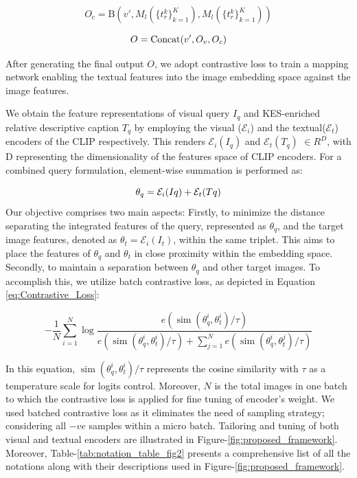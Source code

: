 \documentclass[10pt,lineno]{wlpeerj}
\begin{document}
\begin{equation}
    O_c = \text{B}(v', M_l(\{t_r^k\}_{k=1}^K), M_l(\{t_r^k\}_{k=1}^K))
\label{eq:vi}
\end{equation}

\begin{equation}
    \centering
    O = \text{Concat}(v', O_v, O_c)
\label{eq:O}
\end{equation}

After generating the final output $O$, we adopt contrastive loss to train a mapping network enabling the textual features into the image embedding space against the image features.

We obtain the feature representations of visual query $I_q$ and KES-enriched relative descriptive caption $T_q$ by employing the visual ($\mathcal{E}_i$) and the textual($\mathcal{E}_t$) encoders of the CLIP respectively. This renders $\mathcal{E}_i(I_q)$ and $\mathcal{E}_t(T_q)$ $\in R^D$, with D representing the dimensionality of the features space of CLIP encoders. For a combined query formulation, element-wise summation is performed as:

\begin{equation}
    \centering
    \theta_q  = \mathcal{E}_i(Iq) + \mathcal{E}_t(Tq)
\label{eq:theta_q}
\end{equation}
Our objective comprises two main aspects: Firstly, to minimize the distance separating the integrated features of the query, represented as $\theta_q$, and the target image features, denoted as $\theta_t = \mathcal{E}_i(I_t)$, within the same triplet. This aims to place the features of $\theta_q$ and $\theta_t$ in close proximity within the embedding space. Secondly, to maintain a separation between $\theta_q$ and other target images. To accomplish this, we utilize batch contrastive loss, as depicted in Equation \ref{eq:Contrastive_Loss}:

\begin{equation}\label{eq:Contrastive_Loss}
- \frac{1}{N} \sum_{i=1}^{N} \log \frac{e \left(\operatorname{sim}\left(\theta_q^i, \theta_t^i\right) / \tau\right)}{e \left(\operatorname{sim}\left(\theta_q^i, \theta_t^i\right) / \tau\right)+\sum_{j=1}^{N} e \left(\operatorname{sim}\left(\theta_q^i, \theta_t^j\right) / \tau\right)}
\end{equation}

In this equation, $\operatorname{sim}\left(\theta_q^i, \theta_t^i\right) / \tau$ represents the cosine similarity with $\tau$ as a temperature scale for logits control. Moreover, $N$ is the total images in one batch to which the contrastive loss is applied for fine tuning of encoder's weight. We used batched contrastive loss as it eliminates the need of sampling strategy; considering all $-ve$ samples within a micro batch. Tailoring and tuning of both visual and textual encoders are illustrated in Figure-\ref{fig:proposed_framework}. 
Moreover, Table-\ref{tab:notation_table_fig2} presents a comprehensive list of all the notations along with their descriptions used in Figure-\ref{fig:proposed_framework}.
\end{document}
